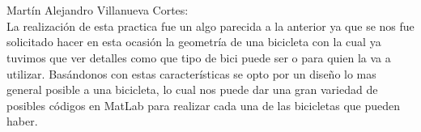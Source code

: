 \documentclass{article}
\begin{document}
\\
\\
Mart\'{i}n Alejandro Villanueva Cortes:
\\La realización de esta practica fue un algo parecida a la anterior ya que se nos fue solicitado hacer en esta ocasión la geometría de una bicicleta con la cual ya tuvimos que ver detalles como que tipo de bici puede ser o para quien la va a utilizar. Basándonos con estas características se opto por un diseño lo mas general posible a una bicicleta, lo cual nos puede dar una gran variedad de posibles códigos en MatLab para realizar cada una de las bicicletas que pueden haber.



\end{document}

